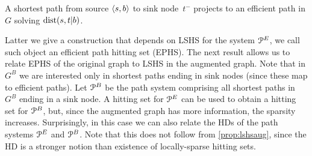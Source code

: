 \begin{proposition}\label{prop:shorteffic}
A shortest path from source $\langle s,b\rangle$ to sink node~$t^-$ projects to an efficient path in $G$ solving $\mbox{dist}(s,t|b)$. 
\end{proposition}
 

Latter we give a construction that depends on LSHS for the system $\mathcal{P}^E$, we call such object an efficient path hitting set (EPHS).
The next result allows us to relate EPHS of the original graph to LSHS in the augmented graph.
Note that in $G^B$ we are interested only in shortest paths ending in sink nodes (since these map to efficient paths). 
Let $\mathcal{P}^B$ be the path system comprising all shortest paths in $G^B$ ending in a sink node.
A hitting set for $\mathcal{P}^E$ can be used to obtain a hitting set for $\mathcal{P}^B$, but, since the augmented graph has more information, the sparsity increases.
Surprisingly, in this case we can also relate the HDs of the path systems $\mathcal{P}^E$ and $\mathcal{P}^B$.
Note that this does not follow from \cref{prop:lshsaug}, since the HD is a stronger notion than existence of locally-sparse hitting sets.
 
